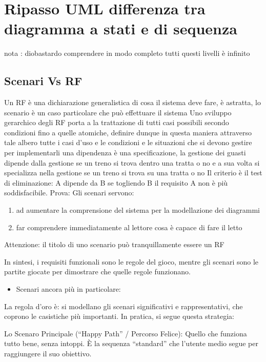 \documentclass[11pt]{article}
\author{marco robba}
\date{\today}
\title{}
\begin{document}
\tableofcontents

\section{Ripasso UML differenza tra diagramma a stati e di sequenza}
\label{sec:orgc1df1d3}
nota : diobastardo comprendere in modo completo tutti questi livelli è infinito
\subsection{Scenari Vs RF}
\label{sec:org7ff3d43}
Un RF è una dichiarazione generalistica di cosa il sistema deve fare, è astratta, lo scenario è un caso particolare che può effettuare il sistema
Uno sviluppo gerarchico degli RF porta a la trattazione di tutti casi possibili secondo condizioni fino a quelle atomiche, definire dunque in questa maniera attraverso tale albero tutte i casi d'uso e le condizioni e le situazioni che si devono gestire per implementarli
una dipendenza è una specificazione, la gestione dei guasti dipende dalla gestione se un treno si trova dentro una tratta o no e a sua volta si specializza nella gestione se un treno si trova su una tratta o no
Il criterio è il test di eliminazione: A dipende da B se togliendo B il requisito A non è più soddisfacibile. Prova:
Gli scenari servono:
\begin{enumerate}
\item ad aumentare la comprensione del sistema per la modellazione dei diagrammi
\item far comprendere immediatamente al lettore cosa è capace di fare il letto
\end{enumerate}
Attenzione: il titolo di uno scenario può tranquillamente essere un RF

In sintesi, i requisiti funzionali sono le regole del gioco, mentre gli scenari sono le partite giocate per dimostrare che quelle regole funzionano.


\begin{itemize}
\item Scenari ancora più in particolare:
\end{itemize}
La regola d'oro è: si modellano gli scenari significativi e rappresentativi, che coprono le casistiche più importanti. In pratica, si segue questa strategia:

Lo Scenaro Principale (``Happy Path'' / Percorso Felice): Quello che funziona tutto bene, senza intoppi. È la sequenza ``standard'' che l'utente medio segue per raggiungere il suo obiettivo.
\end{document}
